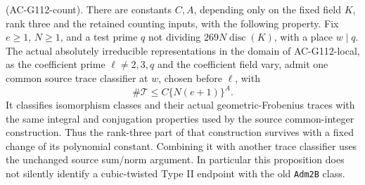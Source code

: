 \begin{proposition}
\label{prop:G112-count}
\textnormal{(AC-G112-count).}
There are constants \(C,A\), depending only on the fixed field \(K\),
rank three and the retained counting inputs, with the following
property.  Fix \(e\geq1\), \(N\geq1\), and a test prime \(q\) not
dividing \(269N\operatorname{disc}(K)\), with a place \(w\mid q\).
The actual absolutely irreducible representations in the domain of
AC-G112-local, as the coefficient prime \(\ell\ne2,3,q\) and the
coefficient field vary, admit one common source trace classifier at
\(w\), chosen before \(\ell\), with
\[
                 \#\mathcal T\leq C\{N(e+1)\}^{A}.
                 \tag{G112.8}
\]
It classifies isomorphism classes and their actual geometric-Frobenius
traces with the same integral and conjugation properties used by the
source common-integer construction.  Thus the rank-three part of that
construction survives with a fixed change of its polynomial constant.
Combining it with another trace classifier uses the unchanged source
sum/norm argument.  In particular this proposition does not silently
identify a cubic-twisted Type II endpoint with the old
\texttt{Adm2B} class.
\end{proposition}

